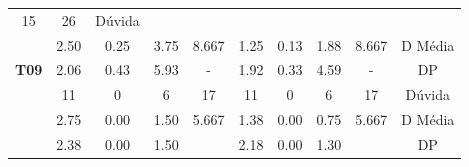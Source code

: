 \begin{table}[htbp]
\begin{tabular}{|cccccccccc}
		\multicolumn{1}{c|}{15} &
		\multicolumn{1}{c|}{26} &
		\multicolumn{1}{c|}{Dúvida} \\ \cline{2-10} 
		\rowcolor[HTML]{D9D9D9} 
		\multicolumn{1}{|c|}{\cellcolor[HTML]{F2F2F2}} &
		\multicolumn{1}{c|}{\cellcolor[HTML]{D9D9D9}2.50} &
		\multicolumn{1}{c|}{\cellcolor[HTML]{D9D9D9}0.25} &
		\multicolumn{1}{c|}{\cellcolor[HTML]{D9D9D9}3.75} &
		\multicolumn{1}{c|}{\cellcolor[HTML]{D9D9D9}8.667} &
		\multicolumn{1}{c|}{\cellcolor[HTML]{D9D9D9}1.25} &
		\multicolumn{1}{c|}{\cellcolor[HTML]{D9D9D9}0.13} &
		\multicolumn{1}{c|}{\cellcolor[HTML]{D9D9D9}1.88} &
		\multicolumn{1}{c|}{\cellcolor[HTML]{D9D9D9}8.667} &
		\multicolumn{1}{c|}{\cellcolor[HTML]{D9D9D9}D Média} \\ \cline{2-10} 
		\multicolumn{1}{|c|}{\multirow{-3}{*}{\cellcolor[HTML]{F2F2F2}\textbf{T09}}} &
		\multicolumn{1}{c|}{2.06} &
		\multicolumn{1}{c|}{0.43} &
		\multicolumn{1}{c|}{5.93} &
		\multicolumn{1}{c|}{-} &
		\multicolumn{1}{c|}{1.92} &
		\multicolumn{1}{c|}{0.33} &
		\multicolumn{1}{c|}{4.59} &
		\multicolumn{1}{c|}{-} &
		\multicolumn{1}{c|}{DP} \\ \hline
		\rowcolor[HTML]{D9D9D9} 
		\multicolumn{1}{|c|}{\cellcolor[HTML]{F2F2F2}} &
		\multicolumn{1}{c|}{\cellcolor[HTML]{D9D9D9}11} &
		\multicolumn{1}{c|}{\cellcolor[HTML]{D9D9D9}0} &
		\multicolumn{1}{c|}{\cellcolor[HTML]{D9D9D9}6} &
		\multicolumn{1}{c|}{\cellcolor[HTML]{D9D9D9}17} &
		\multicolumn{1}{c|}{\cellcolor[HTML]{D9D9D9}11} &
		\multicolumn{1}{c|}{\cellcolor[HTML]{D9D9D9}0} &
		\multicolumn{1}{c|}{\cellcolor[HTML]{D9D9D9}6} &
		\multicolumn{1}{c|}{\cellcolor[HTML]{D9D9D9}17} &
		\multicolumn{1}{c|}{\cellcolor[HTML]{D9D9D9}Dúvida} \\ \cline{2-10} 
		\multicolumn{1}{|c|}{\cellcolor[HTML]{F2F2F2}} &
		\multicolumn{1}{c|}{2.75} &
		\multicolumn{1}{c|}{0.00} &
		\multicolumn{1}{c|}{1.50} &
		\multicolumn{1}{c|}{5.667} &
		\multicolumn{1}{c|}{1.38} &
		\multicolumn{1}{c|}{0.00} &
		\multicolumn{1}{c|}{0.75} &
		\multicolumn{1}{c|}{5.667} &
		\multicolumn{1}{c|}{D Média} \\ \cline{2-10} 
		\rowcolor[HTML]{D9D9D9} 
		\multicolumn{1}{|c|}{\multirow{-3}{*}{\cellcolor[HTML]{F2F2F2}\textbf{T10}}} &
		\multicolumn{1}{c|}{\cellcolor[HTML]{D9D9D9}2.38} &
		\multicolumn{1}{c|}{\cellcolor[HTML]{D9D9D9}0.00} &
		\multicolumn{1}{c|}{\cellcolor[HTML]{D9D9D9}1.50} &
		\multicolumn{1}{c|}{\cellcolor[HTML]{D9D9D9}} &
		\multicolumn{1}{c|}{\cellcolor[HTML]{D9D9D9}2.18} &
		\multicolumn{1}{c|}{\cellcolor[HTML]{D9D9D9}0.00} &
		\multicolumn{1}{c|}{\cellcolor[HTML]{D9D9D9}1.30} &
		\multicolumn{1}{c|}{\cellcolor[HTML]{D9D9D9}} &
		\multicolumn{1}{c|}{\cellcolor[HTML]{D9D9D9}DP} \\ \hline
	\end{tabular}
	\label{tab:F3A1_Duvida_entradas}
\end{table}

